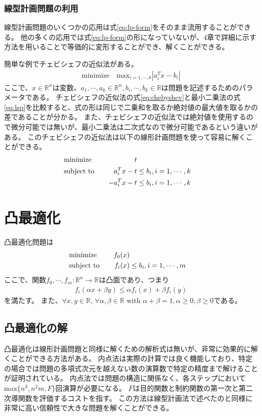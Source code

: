 \documentclass[a4paper, 10pt, uplatex]{jsreport}
\begin{document}
\subsubsection{線型計画問題の利用}
線型計画問題のいくつかの応用は式\eqref{eq:lp-form}をそのまま流用することができる。
他の多くの応用では式\eqref{eq:lp-form}の形になっていないが、4章で詳細に示す方法を用いることで等価的に変形することができ、解くことができる。

簡単な例でチェビシェフの近似法がある。
\begin{align}
    \text{minimize} \quad \text{max}_{i=1,\cdots,k}|a_i^Tx-b_i| \label{eq:chebyshev}
\end{align}
ここで、$x \in \mathbb{R}^n$は変数、$a_1,\cdots,a_k \in \mathbb{R}^n, b_i,\cdots,b_k \in \mathbb{R}$は問題を記述するためのパラメータである。
チェビシェフの近似法の式\eqref{eq:chebyshev}と最小二乗法の式\eqref{eq:lsp}を比較すると、式の形は同じで二乗和を取るか絶対値の最大値を取るかの差であることが分かる。
また、チェビシェフの近似法では絶対値を使用するので微分可能では無いが、最小二乗法は二次式なので微分可能であるという違いがある。
このチェビシェフの近似法は以下の線形計画問題を使って容易に解くことができる。
\begin{alignat}{2}
    &\text{minimize}   &\quad t \notag \\
    &\text{subject to} &\quad a_i^Tx - t &\leq b_i, i = 1,\cdots,k \notag \\
    &                  &\quad -a_i^Tx - t &\leq b_i, i = 1,\cdots,k \label{eq;chebyshev-solve}
\end{alignat}

\section{凸最適化}
凸最適化問題は
\begin{alignat}{2}
    &\text{minimize}    &\quad f_0(x) \notag \\
    &\text{subject to}  &\quad f_i(x) &\leq b_i, i = 1,\cdots,m \label{eq:convex-form}
\end{alignat}
ここで、関数$f_0,\cdots,f_m : \mathbb{R}^n \rightarrow \mathbb{R}$は凸面であり、つまり
\begin{align}
    f_i(\alpha x+\beta y) \leq \alpha f_i(x) + \beta f_i(y)
\end{align}
を満たす。
また、$\forall x, y \in \mathbb{R}$, $\forall \alpha, \beta \in \mathbb{R}$ with $\alpha + \beta = 1, \alpha \geq 0, \beta \geq 0$である。

\subsection{凸最適化の解}
凸最適化は線形計画問題と同様に解くための解析式は無いが、非常に効果的に解くことができる方法がある。
内点法は実際の計算では良く機能しており、特定の場合では問題の多項式次元を越えない数の演算数で特定の精度まで解けることが証明されている。
内点法では問題の構造に関係なく、各ステップにおいてmax$\{n^3, n^2m, F\}$回演算が必要になる。
$F$は目的関数と制約関数の第一次と第二次導関数を評価するコストを指す。
この方法は線型計画法で述べたのと同様に非常に高い信頼性で大きな問題を解くことができる。
\end{document}
